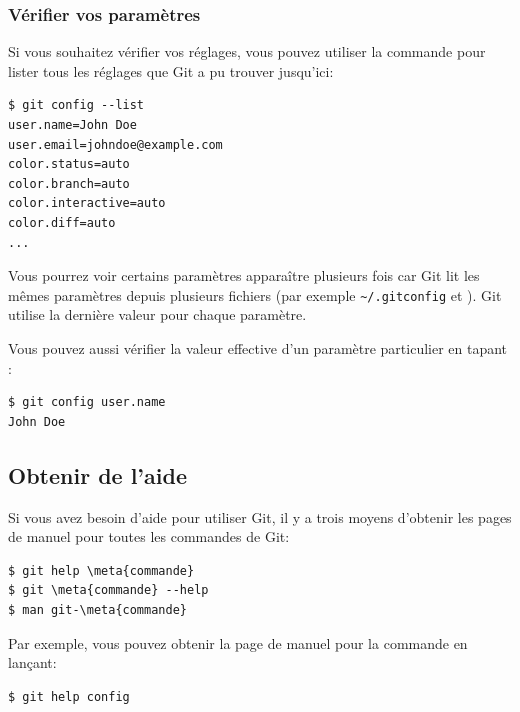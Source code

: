 \subsubsection{Vérifier vos paramètres}

Si vous souhaitez vérifier vos réglages, vous pouvez utiliser la commande  pour lister tous les réglages que Git a pu trouver jusqu'ici:
\begin{Schunk}
\begin{Verbatim}
$ git config --list
user.name=John Doe
user.email=johndoe@example.com
color.status=auto
color.branch=auto
color.interactive=auto
color.diff=auto
...
\end{Verbatim}
\end{Schunk}

Vous pourrez voir certains paramètres apparaître plusieurs fois car Git lit les mêmes paramètres depuis plusieurs fichiers (par exemple \verb=~/.gitconfig= et ).
Git utilise la dernière valeur pour chaque paramètre.

Vous pouvez aussi vérifier la valeur effective d'un paramètre particulier en tapant :
\begin{Schunk}
\begin{Verbatim}
$ git config user.name
John Doe
\end{Verbatim}
\end{Schunk}

\subsection{Obtenir de l'aide}
\label{sec:git:help}

Si vous avez besoin d'aide pour utiliser Git, il y a trois moyens d'obtenir les pages de manuel pour toutes les commandes de Git:

\begin{Schunk}
\begin{Verbatim}[commandchars=\\\{\}]
$ git help \meta{commande}
$ git \meta{commande} --help
$ man git-\meta{commande}
\end{Verbatim}
\end{Schunk}

Par exemple, vous pouvez obtenir la page de manuel pour la commande  en lançant:
\begin{Schunk}
\begin{Verbatim}
$ git help config
\end{Verbatim}
\end{Schunk}

